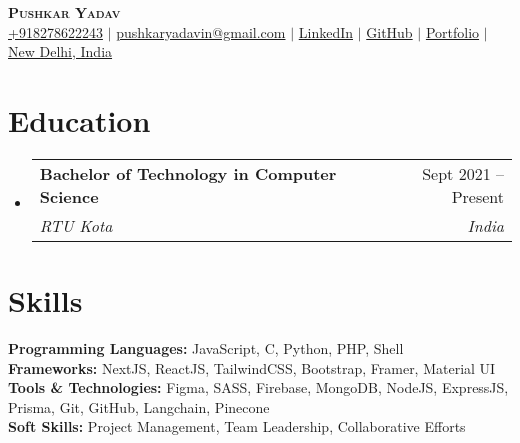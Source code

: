 \documentclass[letterpaper,11pt]{article}
\makeatletter
\newcommand{\resumeEducationHeading}[4]{
  \vspace{-2pt}\item
    \begin{tabular*}{0.97\textwidth}[t]{l@{\extracolsep{\fill}}r}
      \textbf{#1} & #2 \\
      \textit{\small#3} & \textit{\small #4} \\
    \end{tabular*}\vspace{-5pt}
}
\newcommand{\resumeSubHeadingListStart}{\begin{itemize}[leftmargin=0.15in, label={}]}
\newcommand{\resumeSubHeadingListEnd}{\end{itemize}}
\makeatother
\begin{document}

\begin{center}
    \textbf{\Huge \scshape Pushkar Yadav} \\ \vspace{3pt}
    \small
    \faMobile \hspace{.5pt} \href{tel:918278622243}{+918278622243}
    $|$
    \faAt \hspace{.5pt} \href{mailto:pushkaryadavin@gmail.com}{pushkaryadavin@gmail.com}
    $|$
    \faLinkedinSquare \hspace{.5pt} \href{https://www.linkedin.com/in/pushkarydv/}{LinkedIn}
    $|$
    \faGithub \hspace{.5pt} \href{http://github.com/pushkarydv}{GitHub}
    $|$
    \faGlobe \hspace{.5pt} \href{https://pushkaryadav.in}{Portfolio}
    $|$
    \faMapMarker \hspace{.5pt} \href{https://www.google.com/maps/place/new+delhi+india/data=!4m2!3m1!1s0x390cfd5b347eb62d:0x52c2b7494e204dce?sa=X&ved=1t:155783&ictx=111}{New Delhi, India}
\end{center}


\section{Education}
  \vspace{2pt}
  \resumeSubHeadingListStart
    \resumeEducationHeading
      {Bachelor of Technology in Computer Science}{Sept 2021 -- Present}
      {RTU Kota}{India}
  \resumeSubHeadingListEnd


\section{Skills}
  \vspace{2pt}
  \resumeSubHeadingListStart
    \small{\item{
         \textbf{Programming Languages:}{ JavaScript, C, Python, PHP, Shell } \\ \vspace{3pt}
         \textbf{Frameworks:}{ NextJS, ReactJS, TailwindCSS, Bootstrap, Framer, Material UI} \\ \vspace{3pt}
         \textbf{Tools \& Technologies:}{ Figma, SASS, Firebase, MongoDB, NodeJS, ExpressJS, Prisma, Git, GitHub, Langchain, Pinecone} \\ \vspace{3pt}
         \textbf{Soft Skills:}{ Project Management, Team Leadership, Collaborative Efforts} \\ \vspace{3pt}
    }}
  \resumeSubHeadingListEnd
\end{document}
